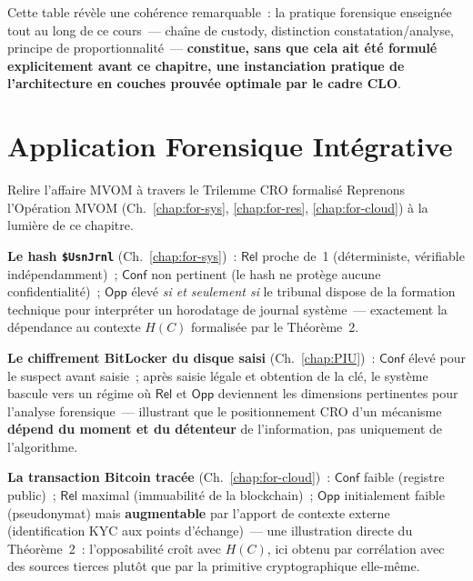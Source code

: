 Cette table révèle une cohérence remarquable~: la pratique
forensique enseignée tout au long de ce cours~--- chaîne de custody,
distinction constatation/analyse, principe de proportionnalité~---
\textbf{constitue, sans que cela ait été formulé explicitement avant
ce chapitre, une instanciation pratique de l'architecture en couches
prouvée optimale par le cadre CLO}.

\section{Application Forensique Intégrative}
\label{sec:application-forensique}

\begin{boxscenario}{Relire l'affaire MVOM à travers le Trilemme CRO formalisé}
Reprenons l'Opération MVOM (Ch.~\ref{chap:for-sys},
\ref{chap:for-res}, \ref{chap:for-cloud}) à la lumière de ce
chapitre.

\textbf{Le hash \texttt{\$UsnJrnl}} (Ch.~\ref{chap:for-sys})~:
$\mathsf{Rel}$ proche de~1 (déterministe, vérifiable
indépendamment)~; $\mathsf{Conf}$ non pertinent (le hash ne protège
aucune confidentialité)~; $\mathsf{Opp}$ élevé \emph{si et seulement
si} le tribunal dispose de la formation technique pour interpréter
un horodatage de journal système~--- exactement la dépendance au
contexte $H(C)$ formalisée par le Théorème~2.

\textbf{Le chiffrement BitLocker du disque saisi}
(Ch.~\ref{chap:PIU})~: $\mathsf{Conf}$ élevé pour le suspect avant
saisie~; après saisie légale et obtention de la clé, le système
bascule vers un régime où $\mathsf{Rel}$ et $\mathsf{Opp}$
deviennent les dimensions pertinentes pour l'analyse forensique~---
illustrant que le positionnement CRO d'un mécanisme \textbf{dépend
du moment et du détenteur} de l'information, pas uniquement de
l'algorithme.

\textbf{La transaction Bitcoin tracée} (Ch.~\ref{chap:for-cloud})~:
$\mathsf{Conf}$ faible (registre public)~; $\mathsf{Rel}$ maximal
(immuabilité de la blockchain)~; $\mathsf{Opp}$ initialement faible
(pseudonymat) mais \textbf{augmentable} par l'apport de contexte
externe (identification KYC aux points d'échange)~--- une
illustration directe du Théorème~2~: l'opposabilité croît avec
$H(C)$, ici obtenu par corrélation avec des sources tierces plutôt
que par la primitive cryptographique elle-même.
\end{boxscenario}

